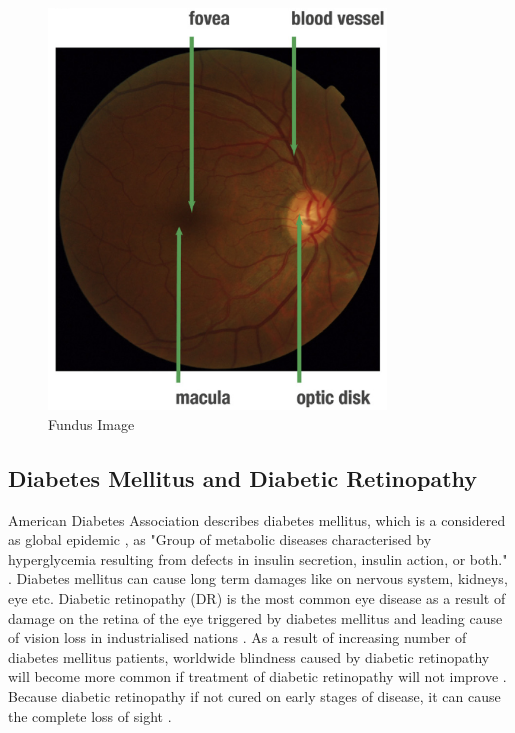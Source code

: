 \begin{figure}[t]
\caption{Fundus Image \citep{mookiah2015application}}
\label{fundusPhotoRetina}
\centering
\includegraphics[width=0.8\textwidth]{Figures/fundus_photography_anatomical}
\end{figure}


\subsection{Diabetes Mellitus and Diabetic Retinopathy}
American Diabetes Association describes diabetes mellitus, which is a considered as global epidemic \citep{falt2012modern}, as "Group of metabolic diseases characterised by hyperglycemia resulting from defects in insulin secretion, insulin action, or both." \citep{national1979classification}. Diabetes mellitus can cause long term damages like on nervous system, kidneys, eye etc. Diabetic retinopathy (DR) is the most common eye disease as a result of damage on the retina of the eye triggered by diabetes mellitus and leading cause of vision loss in industrialised nations \citep{antal2014ensemble, stitt2013advances}. As a result of increasing number of diabetes mellitus patients, worldwide blindness caused by diabetic retinopathy will become more common if treatment of diabetic retinopathy will not improve \citep{wilkinson2003proposed}. Because diabetic retinopathy if not cured on early stages of disease, it can cause the complete loss of sight \citep{rocha2011points}. 

